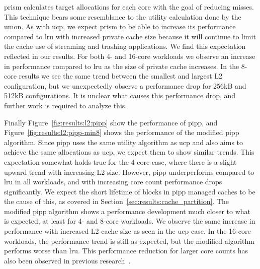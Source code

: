 \gls{prism} calculates target allocations for each core with the goal of reducing misses.
This technique bears some resemblance to the utility calculation done by the \gls{umon}.
As with \gls{ucp}, we expect \gls{prism} to be able to increase its performance compared to \gls{lru} with increased private cache size because it will continue to limit the cache use of streaming and trashing applications.
We find this expectation reflected in our results.
For both 4- and 16-core workloads we observe an increase in performance compared to \gls{lru} as the size of private cache increases.
In the 8-core results we see the same trend between the smallest and largest L2 configuration, but we unexpectedly observe a performance drop for 256kB and 512kB configurations. 
It is unclear what causes this performance drop, and further work is required to analyze this.

Finally Figure~\ref{fig:results:l2:pipp} show the performance of \gls{pipp}, and Figure~\ref{fig:results:l2:pipp-min8} shows the performance of the modified \gls{pipp} algorithm.
Since \gls{pipp} uses the same utility algorithm as \gls{ucp} and also aims to achieve the same allocations as \gls{ucp}, we expect them to show similar trends.
This expectation somewhat holds true for the 4-core case, where there is a slight upward trend with increasing L2 size.
However, \gls{pipp} underperforms compared to \gls{lru} in all workloads, and with increasing core count performance drops significantly.
We expect the short lifetime of blocks in \gls{pipp} managed caches to be the cause of this, as covered in Section~\ref{sec:results:cache_partition}.
The modified \gls{pipp} algorithm shows a performance development much closer to what is expected, at least for 4- and 8-core workloads.
We observe the same increase in performance with increased L2 cache size as seen in the \gls{ucp} case. 
In the 16-core workloads, the performance trend is still as expected, but the modified algorithm performs worse than \gls{lru}.
This performance reduction for larger core counts has also been observed in previous research~\cite{Manikantan2012}.
